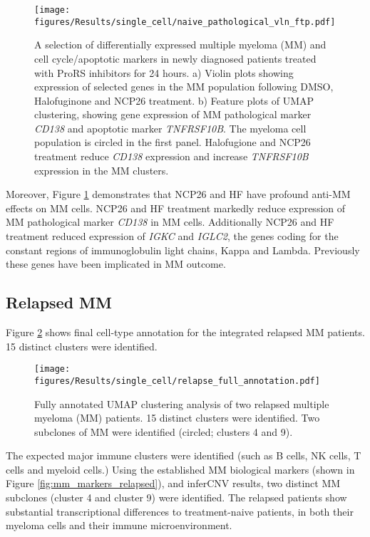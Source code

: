 %
\begin{figure}[htb]
\centering
\texttt{[image: figures/Results/single\_cell/naive\_pathological\_vln\_ftp.pdf]}
\caption[scRNA-seq differentially expressed MM markers- newly diagnosed patients]{A selection of differentially expressed multiple myeloma (MM) and cell cycle/apoptotic markers in newly diagnosed patients treated with ProRS inhibitors for 24 hours.
    a) Violin plots showing expression of selected genes in the MM population following DMSO, Halofuginone and NCP26 treatment.
    b) Feature plots of UMAP clustering, showing gene expression of MM pathological marker \textit{CD138} and apoptotic marker \textit{TNFRSF10B}.
The myeloma cell population is circled in the first panel.
Halofugione and NCP26 treatment reduce \textit{CD138} expression and increase \textit{TNFRSF10B} expression in the MM clusters.}
\label{fig:naive_path_vln_ftp}
\end{figure}
Moreover, Figure \ref{fig:naive_path_vln_ftp} demonstrates that NCP26 and HF have profound anti-MM effects on MM cells.
NCP26 and HF treatment markedly reduce expression of MM pathological marker \textit{CD138} in MM cells.
Additionally NCP26 and HF treatment reduced expression of \textit{IGKC} and \textit{IGLC2}, the genes coding for the constant regions of immunoglobulin light chains, Kappa and Lambda.
Previously these genes have been implicated in MM outcome.



\clearpage
\subsection{Relapsed MM}
Figure \ref{fig:full_anno_relapse} shows final cell-type annotation for the integrated relapsed MM patients.
15 distinct clusters were identified.
\begin{figure}[hpt]
\centering
\texttt{[image: figures/Results/single\_cell/relapse\_full\_annotation.pdf]}
\caption[Relapsed MM scRNA-seq full annotation]{Fully annotated UMAP clustering analysis of two relapsed multiple myeloma (MM) patients.
15 distinct clusters were identified.
Two subclones of MM were identified (circled; clusters 4 and 9).}
\label{fig:full_anno_relapse}
\end{figure}
The expected major immune clusters were identified (such as B cells, NK cells, T cells and myeloid cells.)
Using the established MM biological markers (shown in Figure \ref{fig:mm_markers_relapsed}), and inferCNV results, two distinct MM subclones (cluster 4 and cluster 9) were identified.
The relapsed patients show substantial transcriptional differences to treatment-naive patients, in both their myeloma cells and their immune microenvironment.

